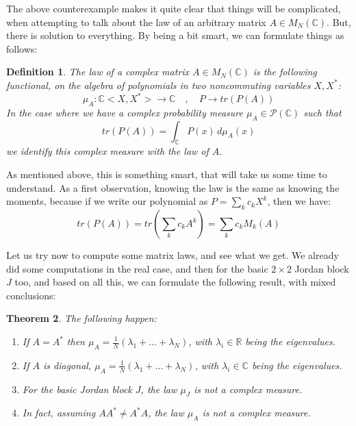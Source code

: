\documentclass[12pt]{amsbook}
\newtheorem{theorem}{Theorem}[chapter]
\newtheorem{definition}[theorem]{Definition}
\begin{document}
The above counterexample makes it quite clear that things will be complicated, when attempting to talk about the law of an arbitrary matrix $A\in M_N(\mathbb C)$. But, there is solution to everything. By being a bit smart, we can formulate things as follows:


\begin{definition}
The law of a complex matrix $A\in M_N(\mathbb C)$ is the following functional, on the algebra of polynomials in two noncommuting variables $X,X^*$:
$$\mu_A:\mathbb C<X,X^*>\to\mathbb C\quad,\quad P\to tr(P(A))$$
In the case where we have a complex probability measure $\mu_A\in\mathcal P(\mathbb C)$ such that
$$tr(P(A))=\int_\mathbb CP(x)\,d\mu_A(x)$$
we identify this complex measure with the law of $A$.
\end{definition}

As mentioned above, this is something smart, that will take us some time to understand. As a first observation, knowing the law is the same as knowing the moments, because if we write our polynomial as $P=\sum_kc_kX^k$, then we have:
$$tr(P(A))
=tr\left(\sum_kc_kA^k\right)
=\sum_kc_kM_k(A)$$

Let us try now to compute some matrix laws, and see what we get. We already did some computations in the real case, and then for the basic $2\times2$ Jordan block $J$ too, and based on all this, we can formulate the following result, with mixed conclusions:

\begin{theorem}
The following happen:
\begin{enumerate}
\item If $A=A^*$ then $\mu_A=\frac{1}{N}(\lambda_1+\ldots+\lambda_N)$, with $\lambda_i\in\mathbb R$ being the eigenvalues.

\item If $A$ is diagonal, $\mu_A=\frac{1}{N}(\lambda_1+\ldots+\lambda_N)$, with $\lambda_i\in\mathbb C$ being the eigenvalues.

\item For the basic Jordan block $J$, the law $\mu_J$ is not a complex measure.

\item In fact, assuming $AA^*\neq A^*A$, the law $\mu_A$ is not a complex measure.
\end{enumerate}
\end{theorem}
\end{document}
